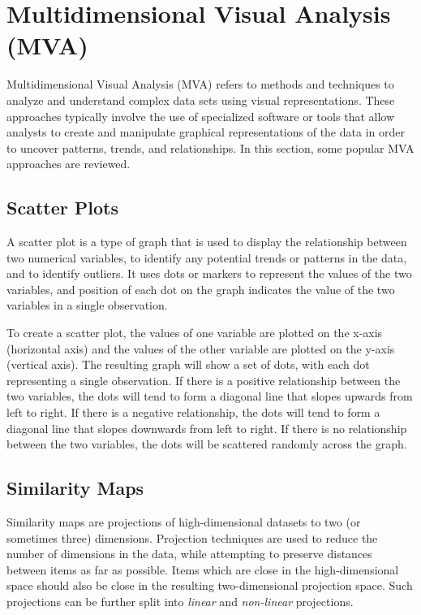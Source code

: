 
\chapter{Multidimensional Visual Analysis (MVA)}

\label{chap:MVA}

Multidimensional Visual Analysis (MVA) refers to methods and
techniques to analyze and understand complex data sets using visual
representations. These approaches typically involve the use of
specialized software or tools that allow analysts to create and
manipulate graphical representations of the data in order to uncover
patterns, trends, and relationships. In this section, some popular MVA
approaches are reviewed.



\section{Scatter Plots}

A scatter plot is a type of graph that is used to display the
relationship between two numerical variables, to identify any
potential trends or patterns in the data, and to identify outliers. It
uses dots or markers to represent the values of the two variables, and
position of each dot on the graph indicates the value of the two
variables in a single observation.

To create a scatter plot, the values of one variable are plotted on
the x-axis (horizontal axis) and the values of the other variable are
plotted on the y-axis (vertical axis). The resulting graph will show a
set of dots, with each dot representing a single observation. If there
is a positive relationship between the two variables, the dots will
tend to form a diagonal line that slopes upwards from left to
right. If there is a negative relationship, the dots will tend to form
a diagonal line that slopes downwards from left to right. If there is
no relationship between the two variables, the dots will be scattered
randomly across the graph.





\section{Similarity Maps}

Similarity maps are projections of high-dimensional datasets to two
(or sometimes three) dimensions. Projection techniques are used to
reduce the number of dimensions in the data, while attempting to
preserve distances between items as far as possible. Items which are
close in the high-dimensional space should also be close in the
resulting two-dimensional projection space. Such projections can be
further split into \emph{linear} and \emph{non-linear} projections.


